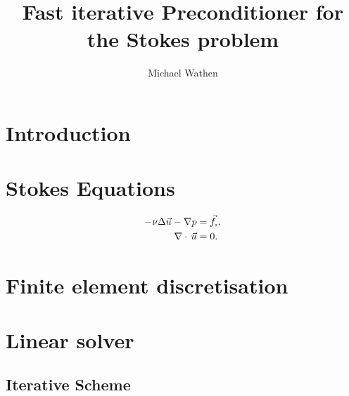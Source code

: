 \documentclass[11pt]{article}
\numberwithin{equation}{section}    %
\renewcommand{\div}{\nabla\cdot\,}
\newcommand{\U}{\vec u}
\newcommand{\Fs}{\vec{f}_{\mbox{\tiny s}}}
\begin{document}
\pagestyle{fancyplain}
\fancyhead{}
\fancyfoot{} %
\fancyfoot[LE,RO]{\thepage \hspace{-5mm}}
\fancyfoot[CO,RE]{}

\title{Fast iterative Preconditioner for the Stokes problem}
\author{Michael Wathen}
\maketitle

\section{Introduction} \label{sec:intro}



\section{Stokes Equations} \label{sec:stokes}



\begin{equation} \label{eq:Stokes}
    \begin{aligned}
        -\nu \Delta \U- \nabla p &= \Fs,\\
        \div \U     &= 0.
    \end{aligned}
\end{equation}

\section{Finite element discretisation} \label{sec:discretisation}



\section{Linear solver} \label{sec:solver}



\subsection{Iterative Scheme} \label{sec:itersolver}

\noindent{}
\end{document}
